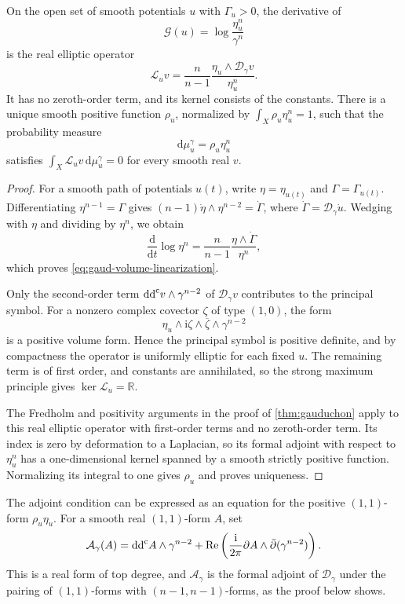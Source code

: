 \begin{proposition}\label{prop:gaud-volume-linearization}
On the open set of smooth potentials $u$ with $\Gamma_u>0$, the derivative of
\[
 \mathcal G(u)=\log\frac{\eta_u^n}{\gamma^n}
\]
is the real elliptic operator
\begin{equation}\label{eq:gaud-volume-linearization}
 \mathcal L_uv=
 \frac{n}{n-1}\frac{\eta_u\wedge\mathcal D_\gamma v}{\eta_u^n}.
\end{equation}
It has no zeroth-order term, and its kernel consists of the constants. There is a unique smooth positive function $\rho_u$, normalized by $\int_X\rho_u\eta_u^n=1$, such that the probability measure
\[
 \mathrm{d}\mu_u^\gamma=\rho_u\eta_u^n
\]
satisfies $\int_X\mathcal L_uv\,\mathrm{d}\mu_u^\gamma=0$ for every smooth real $v$.
\end{proposition}
\begin{proof}
For a smooth path of potentials $u(t)$, write $\eta=\eta_{u(t)}$ and $\Gamma=\Gamma_{u(t)}$. Differentiating $\eta^{n-1}=\Gamma$ gives
$(n-1)\dot\eta\wedge\eta^{n-2}=\dot\Gamma$, where $\dot\Gamma=\mathcal D_\gamma\dot u$. Wedging with $\eta$ and dividing by $\eta^n$, we obtain
\[
 \frac{\mathrm{d}}{\mathrm{d}t}\log\eta^n
 =\frac{n}{n-1}\frac{\eta\wedge\dot\Gamma}{\eta^n},
\]
which proves \eqref{eq:gaud-volume-linearization}.

Only the second-order term $\mathrm{dd}^{\mathrm{c}} v\wedge\gamma^{n-2}$ of $\mathcal D_\gamma v$ contributes to the principal symbol. For a nonzero complex covector $\zeta$ of type $(1,0)$, the form
\[
 \eta_u\wedge\mathrm i\zeta\wedge\overline\zeta
                       \wedge\gamma^{n-2}
\]
is a positive volume form. Hence the principal symbol is positive definite, and by compactness the operator is uniformly elliptic for each fixed $u$. The remaining term is of first order, and constants are annihilated, so the strong maximum principle gives $\ker\mathcal L_u=\mathbb R$.

The Fredholm and positivity arguments in the proof of \cref{thm:gauduchon} apply to this real elliptic operator with first-order terms and no zeroth-order term. Its index is zero by deformation to a Laplacian, so its formal adjoint with respect to $\eta_u^n$ has a one-dimensional kernel spanned by a smooth strictly positive function. Normalizing its integral to one gives $\rho_u$ and proves uniqueness.
\end{proof}

The adjoint condition can be expressed as an equation for the positive $(1,1)$-form $\rho_u\eta_u$. For a smooth real $(1,1)$-form $A$, set
\[
 \mathcal A_\gamma(A)
 =\mathrm{dd}^{\mathrm{c}} A\wedge\gamma^{n-2}
 +\operatorname{Re}\left(\frac{\mathrm i}{2\pi}
              \partial A\wedge\bar\partial(\gamma^{n-2})\right).
\]
This is a real form of top degree, and $\mathcal A_\gamma$ is the formal adjoint of $\mathcal D_\gamma$ under the pairing of $(1,1)$-forms with $(n-1,n-1)$-forms, as the proof below shows.

